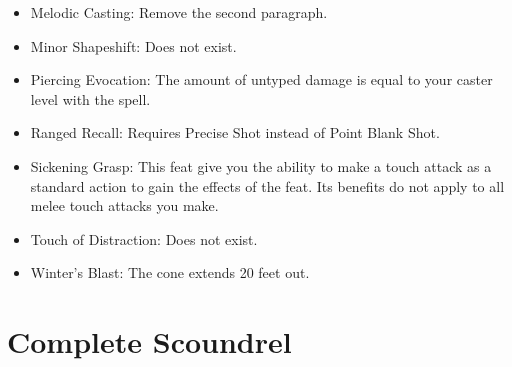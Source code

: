 \begin{itemize}
\item Melodic Casting: Remove the second paragraph.
\item Minor Shapeshift: Does not exist.
\item Piercing Evocation: The amount of untyped damage is equal to your caster level with the spell.
\item Ranged Recall: Requires Precise Shot instead of Point Blank Shot.
\item Sickening Grasp: This feat give you the ability to make a touch attack as a standard action to gain the effects of the feat. Its benefits do not apply to all melee touch attacks you make.
\item Touch of Distraction: Does not exist.
\item Winter's Blast: The cone extends 20 feet out.
\end{itemize}

\section{Complete Scoundrel}

